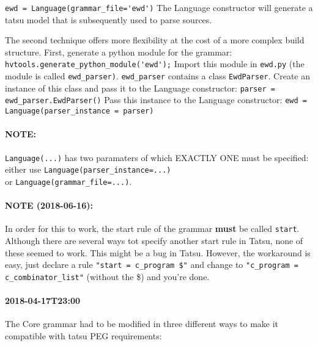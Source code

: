 \documentclass[11pt, a4paper]{article}
\begin{document}
\verb|ewd = Language(grammar_file='ewd')|
The Language constructor will generate a tatsu model that is subsequently used to parse sources.

The second technique offers more flexibility at the cost of a more complex build structure.
First, generate a python module for the grammar:\\
\verb|hvtools.generate_python_module('ewd');|
Import this module in \verb|ewd.py| (the module is called \verb|ewd_parser)|. 
\verb|ewd_parser| contains a class \verb|EwdParser|. 
Create an instance of this class and pass it to the Language constructor:
\verb|parser = ewd_parser.EwdParser()|
Pass this instance to the Language constructor:
\verb|ewd = Language(parser_instance = parser)|

\paragraph{NOTE:} \verb|Language(...)| has two paramaters of which EXACTLY ONE must be specified: either use
\verb|Language(parser_instance=...)| \\
or \verb|Language(grammar_file=...)|.

\paragraph{NOTE (2018-06-16):} In order for this to work, the start rule of the grammar \textbf{must} be called \verb|start|. 
Although there are several ways tot specify another start rule in Tatsu, none of these seemed to work. 
This might be a bug in Tatsu. 
However, the workaround is easy, just declare a rule \verb|"start = c_program $"| and change to \verb|"c_program = c_combinator_list"| (without the \$) and you're done.

\paragraph{2018-04-17T23:00}

The Core grammar had to be modified in three different ways to make it compatible with tatsu PEG requirements:
\end{document}
